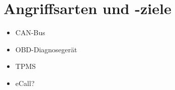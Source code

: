 \section{Angriffsarten und -ziele}

\begin{itemize}
    \item CAN-Bus
    \item OBD-Diagnosegerät
    \item TPMS
    \item eCall?
\end{itemize}